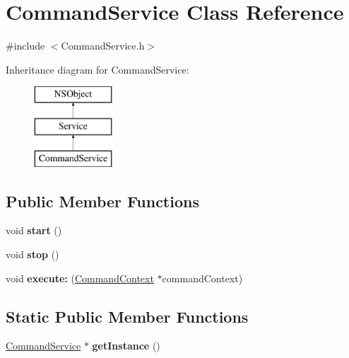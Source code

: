 \hypertarget{interface_command_service}{
\section{\-Command\-Service \-Class \-Reference}
\label{interface_command_service}
}


{\ttfamily \#include $<$\-Command\-Service.\-h$>$}

\-Inheritance diagram for \-Command\-Service\-:\begin{figure}[H]
\begin{center}
\leavevmode
\includegraphics[height=3.000000cm]{interface_command_service}
\end{center}
\end{figure}
\subsection*{\-Public \-Member \-Functions}
\begin{DoxyCompactItemize}
\item 
\hypertarget{interface_command_service_aba03ffad968007c896457fe0b6743fcf}{
void {\bfseries start} ()}
\label{interface_command_service_aba03ffad968007c896457fe0b6743fcf}

\item 
\hypertarget{interface_command_service_a216bee3c8f8d6a3b2684627c1beee241}{
void {\bfseries stop} ()}
\label{interface_command_service_a216bee3c8f8d6a3b2684627c1beee241}

\item 
\hypertarget{interface_command_service_a9257f7f735ab4999662bd386477d8d77}{
void {\bfseries execute\-:} (\hyperlink{interface_command_context}{\-Command\-Context} $\ast$command\-Context)}
\label{interface_command_service_a9257f7f735ab4999662bd386477d8d77}

\end{DoxyCompactItemize}
\subsection*{\-Static \-Public \-Member \-Functions}
\begin{DoxyCompactItemize}
\item 
\hypertarget{interface_command_service_a12423947ccf0cba3f82eb3f2e7f960ca}{
\hyperlink{interface_command_service}{\-Command\-Service} $\ast$ {\bfseries get\-Instance} ()}
\label{interface_command_service_a12423947ccf0cba3f82eb3f2e7f960ca}

\end{DoxyCompactItemize}


